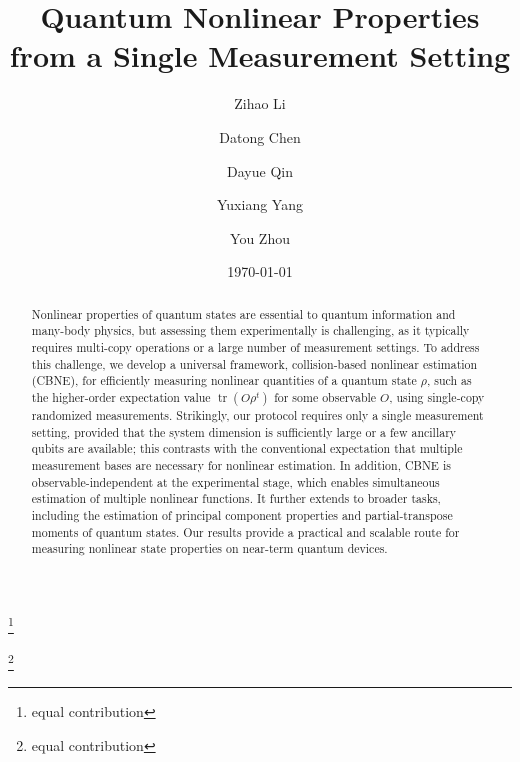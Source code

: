 \documentclass[aps,prl,twocolumn,nofootinbib,superscriptaddress,10pt]{revtex4-2}
\DeclareMathOperator{\Tr}{tr}
\theoremstyle{plain}
\theoremstyle{definition}
\begin{document}
\title{Quantum Nonlinear Properties from a Single Measurement Setting}


\author{Zihao Li}
\thanks{equal contribution}

\author{Datong Chen}
\thanks{equal contribution}

\author{Dayue Qin}

\author{Yuxiang Yang}

\author{You Zhou}


\date{\today}

\begin{abstract}
Nonlinear properties of quantum states are essential to quantum information and many-body physics, but assessing them experimentally is challenging, as it typically requires multi-copy operations or a large number of measurement settings.
To address this challenge, we develop a universal framework, collision-based nonlinear estimation (CBNE), for efficiently measuring nonlinear quantities of a quantum state $\rho$, such as the higher-order expectation value \(\Tr(O\rho^t)\) for some observable $O$, using single-copy randomized measurements. Strikingly, our protocol requires only a single measurement setting, provided that the system dimension is sufficiently large or a few ancillary qubits are available; this contrasts with the conventional expectation that multiple measurement bases are necessary for nonlinear estimation. In addition, CBNE is observable-independent at the experimental stage, which enables simultaneous estimation of multiple nonlinear functions. It further extends to broader tasks, including the estimation of principal component properties and partial-transpose moments of quantum states. Our results provide a practical and scalable route for measuring nonlinear state properties on near-term quantum devices.
\end{abstract}
\end{document}

